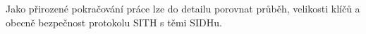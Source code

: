 \documentclass[12pt]{report}
\begin{document}
Jako přirozené pokračování práce lze do detailu porovnat průběh, velikosti klíčů a obecně bezpečnost protokolu SITH s těmi SIDHu. 




\end{document}
